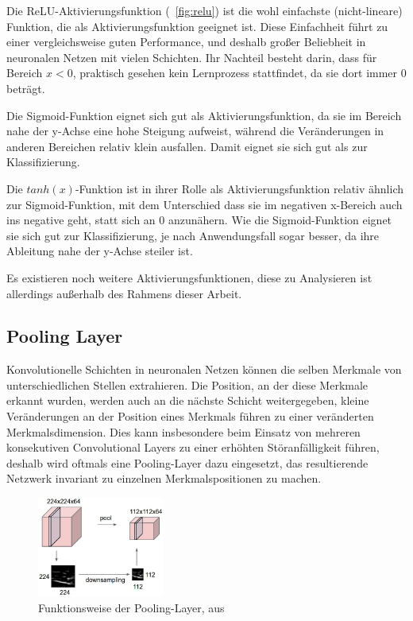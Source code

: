 Die ReLU-Aktivierungsfunktion (\vgl \figurename~\ref{fig:relu}) ist die wohl einfachste (nicht-lineare) Funktion, die als Aktivierungsfunktion geeignet ist. Diese Einfachheit führt zu einer vergleichsweise guten Performance, und deshalb großer Beliebheit in neuronalen Netzen mit vielen Schichten. Ihr Nachteil besteht darin, dass für Bereich $x<0$, praktisch gesehen kein Lernprozess stattfindet, da sie dort immer $0$ beträgt. \cite{kizrak_19}

Die Sigmoid-Funktion eignet sich gut als Aktivierungsfunktion, da sie im Bereich nahe der y-Achse eine hohe Steigung aufweist, während die Veränderungen in anderen Bereichen relativ klein ausfallen. Damit eignet sie sich gut als zur Klassifizierung. \cite{kizrak_19}

Die $tanh(x)$-Funktion ist in ihrer Rolle als Aktivierungsfunktion relativ ähnlich zur Sigmoid-Funktion, mit dem Unterschied dass sie im negativen x-Bereich auch ins negative geht, statt sich an $0$ anzunähern. Wie die Sigmoid-Funktion eignet sie sich gut zur Klassifizierung, je nach Anwendungsfall sogar besser, da ihre Ableitung nahe der y-Achse steiler ist. \cite{kizrak_19}

Es existieren noch weitere Aktivierungsfunktionen, diese zu Analysieren ist allerdings außerhalb des Rahmens dieser Arbeit.

\subsection{Pooling Layer}
\label{ssec:pooling}

Konvolutionelle Schichten in neuronalen Netzen können die selben Merkmale von unterschiedlichen Stellen extrahieren. Die Position, an der diese Merkmale erkannt wurden, werden auch an die nächste Schicht weitergegeben, \dahe kleine Veränderungen an der Position eines Merkmals führen zu einer veränderten Merkmalsdimension. \cite{brownlee_19} Dies kann insbesondere beim Einsatz von mehreren konsekutiven Convolutional Layers zu einer erhöhten Störanfälligkeit führen, deshalb wird oftmals eine Pooling-Layer dazu eingesetzt, das resultierende Netzwerk invariant zu einzelnen Merkmalspositionen zu machen. \cite{deeplearning_16}

\begin{figure}
	\centering
	\includegraphics[width=0.37\textwidth,keepaspectratio]{images/cs231n/pool.jpg}
	\captionsetup{format=plain}
	\caption{Funktionsweise der Pooling-Layer, aus \cite{cs231n}}
	\label{fig:pooling}
\end{figure}

